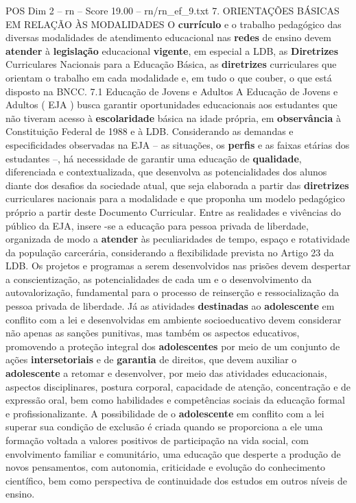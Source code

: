 \begin{textsample}{POS Dim 2 – rn – Score 19.00 – rn/rn\_ef\_9.txt}  \label{ex:f2_pos_249}
7.
ORIENTAÇÕES BÁSICAS EM RELAÇÃO ÀS MODALIDADES O \textbf{currículo} e o trabalho pedagógico das diversas modalidades de atendimento educacional nas \textbf{redes} de ensino devem \textbf{atender} à \textbf{legislação} educacional \textbf{vigente}, em especial a LDB, as \textbf{Diretrizes} Curriculares Nacionais para a Educação Básica, as \textbf{diretrizes} curriculares que orientam o trabalho em cada modalidade e, em tudo o que couber, o que está disposto na BNCC. 7.1 Educação de Jovens e Adultos A Educação de Jovens e Adultos ( EJA ) busca garantir oportunidades educacionais aos estudantes que não tiveram acesso à \textbf{escolaridade} básica na idade própria, em \textbf{observância} à Constituição Federal de 1988 e à LDB.
Considerando as demandas e especificidades observadas na EJA – as situações, os \textbf{perfis} e as faixas etárias dos estudantes –, há necessidade de garantir uma educação de \textbf{qualidade}, diferenciada e contextualizada, que desenvolva as potencialidades dos alunos diante dos desafios da sociedade atual, que seja elaborada a partir das \textbf{diretrizes} curriculares nacionais para a modalidade e que proponha um modelo pedagógico próprio a partir deste Documento Curricular.
Entre as realidades e vivências do público da EJA, insere -se a educação para pessoa privada de liberdade, organizada de modo a \textbf{atender} às peculiaridades de tempo, espaço e rotatividade da população carcerária, considerando a flexibilidade prevista no Artigo 23 da LDB.
Os projetos e programas a serem desenvolvidos nas prisões devem despertar a conscientização, as potencialidades de cada um e o desenvolvimento da autovalorização, fundamental para o processo de reinserção e ressocialização da pessoa privada de liberdade.
Já as atividades \textbf{destinadas} ao \textbf{adolescente} em conflito com a lei e desenvolvidas em ambiente socioeducativo devem considerar não apenas as sanções punitivas, mas também os aspectos educativos, promovendo a proteção integral dos \textbf{adolescentes} por meio de um conjunto de ações \textbf{intersetoriais} e de \textbf{garantia} de direitos, que devem auxiliar o \textbf{adolescente} a retomar e desenvolver, por meio das atividades educacionais, aspectos disciplinares, postura corporal, capacidade de atenção, concentração e de expressão oral, bem como habilidades e competências sociais da educação formal e profissionalizante.
A possibilidade de o \textbf{adolescente} em conflito com a lei superar sua condição de exclusão é criada quando se proporciona a ele uma formação voltada a valores positivos de participação na vida social, com envolvimento familiar e comunitário, uma educação que desperte a produção de novos pensamentos, com autonomia, criticidade e evolução do conhecimento científico, bem como perspectiva de continuidade dos estudos em outros níveis de ensino.

\end{textsample}
